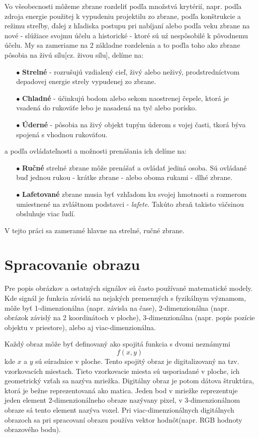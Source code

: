 Vo všeobecnosti môžeme zbrane rozdeliť podľa množstvá krytérií, napr. podľa zdroja energie použitej k vypudeniu projektilu zo zbrane,
podľa konštrukcie a režimu streľby, ďalej z hľadiska postupu pri nabíjaní alebo podľa veku zbrane na nové - slúžiace svojmu účelu a historické - ktoré sú uź nespôsobilé k pôvodnemu účelu.
My sa zameriame na 2 základne rozdelenia a to poďla toho ako zbrane pôsobia na živú sílu[cz. živou sílu], delíme na\cite{book:StrelneZbrane}:
\begin{enumerate}
	\item[$\bullet$] \textbf{Strelné} - rozrušujú vzdialený cieľ, živý alebo neživý, prodstredníctvom depadovej energie strely vypudenej zo zbrane.
	\item[$\bullet$] \textbf{Chladné} - účinkujú bodom alebo sekom naostrenej čepele, ktorá je vsadená do rukoväťe lebo je nasadená na tyč alebo porísko.
    \item[$\bullet$] \textbf{Úderné} - pôsobia na živý objekt tupým úderom s vojej časti, tkorá býva spojená s vhodnou rukoväťou.
\end{enumerate}
a podľa ovládateľnosti a možnosti prenášania ich delíme na\cite{book:StrelneZbrane}:
\begin{enumerate}
	\item[$\bullet$] \textbf{Ručné} strelné zbrane môže prenášať a ovládať jediná osoba. Sú ovládané buď jednou rukou - krátke zbrane - alebo oboma rukami - dlhé zbrane.
	\item[$\bullet$] \textbf{Lafetované} zbrane musia byť vzhľadom ku svojej hmotnosti a rozmerom umiestnené na zvláštnom podstavci - \textit{lafete}. Takúto zbraň takisto väčsinou obsluhuje viac ľudí.
\end{enumerate}
V tejto práci sa zameramé hlavne na strelné, ručné zbrane.

\section{Spracovanie obrazu}
Pre popis obrázkov a ostatných signálov sú často používané matematické modely.
Kde signál je funkcia závislá na nejakých premenných s fyzikálnym významom, môže byť 1-dimenzionálna (napr. závisla na čase),
2-dimenzionálna (napr. obrázok závislý na 2 koordinátoch v ploche), 3-dimenzionálna (napr. popis pozície objektu v priestore), alebo aj viac-dimenzionálna\cite{book:ImageProcessing}.

    Každý obraz môže byť definovaný ako spojitá funkcia s dvomi neznámymi $$f(x,y)$$ kde $x$ a $y$ sú súradnice v ploche.
Tento spojitý obraz je digitalizovaný na tzv. vzorkovacích miestach.
Tieto vzorkovacie miesta sú usporiadané v ploche, ich geometrický vzťah sa nazýva mriežka.
Digitálny obraz je potom dátova štruktúra, ktorá je bežne reprezentovaná ako matica.
Jeden bod v mriežke reprezentuje jeden element 2-dimenzionálneho obraze nazývany pixel, v 3-dimenzionálnom obraze sá tento element nazýva voxel\cite{book:ImageProcessing}.
Pri viac-dimenzionálnych digitálnych obrazoch sa pri spracovaní obrazu používa vektor hodnôt(napr. RGB hodnoty obrazového bodu).


